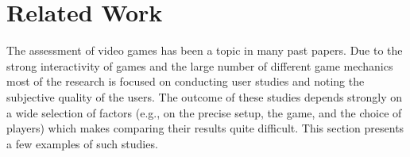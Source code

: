 \section{Related Work}
\label{sec:relatedwork}










The assessment of video games has been a topic in many past papers. Due to the strong interactivity of games and the large number of different game mechanics most of the research is focused on conducting user studies and noting the subjective quality of the users. The outcome of these studies depends strongly on a wide selection of factors (e.g., on the precise setup, the game, and the choice of players) which makes comparing their results quite difficult. This section presents a few examples of such studies.

